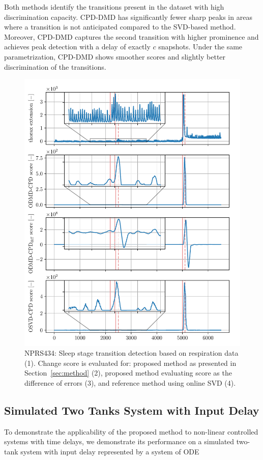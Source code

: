 Both methods identify the transitions present in the dataset with high discrimination capacity. CPD-DMD has significantly fewer sharp peaks in areas where a transition is not anticipated compared to the SVD-based method. Moreover, CPD-DMD captures the second transition with higher prominence and achieves peak detection with a delay of exactly \(c\) snapshots. Under the same parametrization, CPD-DMD shows smoother scores and slightly better discrimination of the transitions.

\begin{figure}[H]
    \centering
    \includegraphics[width=\linewidth]{figures/nprs44-chd_r2-roll_301-dmd_w1.0-h80.pdf}
    \caption{NPRS434: Sleep stage transition detection based on respiration data (1). Change score is evaluated for: proposed method as presented in Section~\ref{sec:method} (2), proposed method evaluating score as the difference of errors (3), and reference method using online SVD (4).}\label{fig:nprs44}
\end{figure}

\subsection{Simulated Two Tanks System with Input Delay}
To demonstrate the applicability of the proposed method to non-linear controlled systems with time delays, we demonstrate its performance on a simulated two-tank system with input delay represented by a system of ODE

